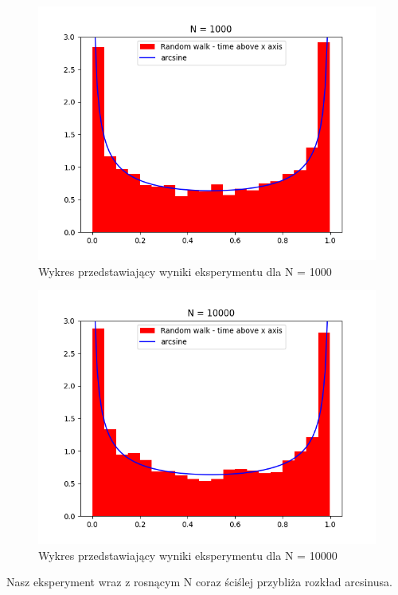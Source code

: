 \documentclass{report}
\begin{document}
\begin{figure}[htp]
    \centering
    \includegraphics[scale=0.5]{plotZad3N1000.png}
    \caption[Example .]{Wykres przedstawiający wyniki eksperymentu dla N = 1000}
    \label{plotB}
\end{figure}

\begin{figure}[H]
    \centering
    \includegraphics[scale=0.7]{plotZad3N10000.png}
    \caption[Example .]{Wykres przedstawiający wyniki eksperymentu dla N = 10000}
    \label{plotB}
\end{figure}

Nasz eksperyment wraz z rosnącym N coraz ściślej przybliża rozkład arcsinusa.
\end{document}
